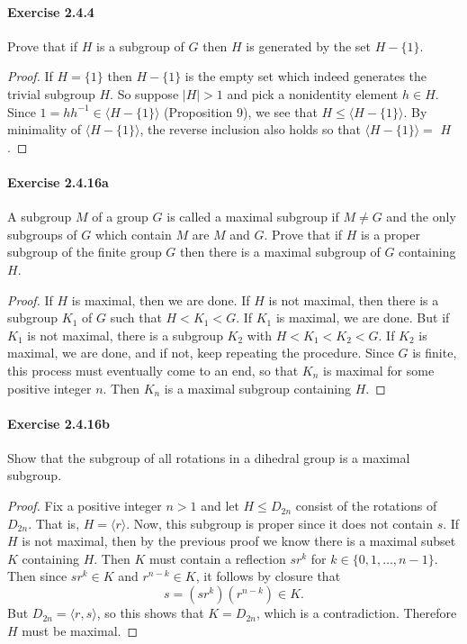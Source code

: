 \documentclass{article}
\theoremstyle{definition}
\begin{document}
\paragraph{Exercise 2.4.4} Prove that if $H$ is a subgroup of $G$ then $H$ is generated by the set $H-\{1\}$.
\begin{proof}
    If $H=\{1\}$ then $H-\{1\}$ is the empty set which indeed generates the trivial subgroup $H$. So suppose $|H|>1$ and pick a nonidentity element $h \in H$. Since $1=h h^{-1} \in\langle H-\{1\}\rangle$ (Proposition 9), we see that $H \leq\langle H-\{1\}\rangle$. By minimality of $\langle H-\{1\}\rangle$, the reverse inclusion also holds so that $\langle H-\{1\}\rangle=$ $H$.
\end{proof}



\paragraph{Exercise 2.4.16a} A subgroup $M$ of a group $G$ is called a maximal subgroup if $M \neq G$ and the only subgroups of $G$ which contain $M$ are $M$ and $G$. Prove that if $H$ is a proper subgroup of the finite group $G$ then there is a maximal subgroup of $G$ containing $H$.
\begin{proof}
If $H$ is maximal, then we are done. If $H$ is not maximal, then there is a subgroup $K_1$ of $G$ such that $H<K_1<G$. If $K_1$ is maximal, we are done. But if $K_1$ is not maximal, there is a subgroup $K_2$ with $H<K_1<K_2<G$. If $K_2$ is maximal, we are done, and if not, keep repeating the procedure. Since $G$ is finite, this process must eventually come to an end, so that $K_n$ is maximal for some positive integer $n$. Then $K_n$ is a maximal subgroup containing $H$.
\end{proof}



\paragraph{Exercise 2.4.16b} Show that the subgroup of all rotations in a dihedral group is a maximal subgroup.
\begin{proof}
    Fix a positive integer $n>1$ and let $H \leq D_{2 n}$ consist of the rotations of $D_{2 n}$. That is, $H=\langle r\rangle$. Now, this subgroup is proper since it does not contain $s$. If $H$ is not maximal, then by the previous proof we know there is a maximal subset $K$ containing $H$. Then $K$ must contain a reflection $s r^k$ for $k \in\{0,1, \ldots, n-1\}$. Then since $s r^k \in K$ and $r^{n-k} \in K$, it follows by closure that
$$
s=\left(s r^k\right)\left(r^{n-k}\right) \in K .
$$
But $D_{2 n}=\langle r, s\rangle$, so this shows that $K=D_{2 n}$, which is a contradiction. Therefore $H$ must be maximal.
\end{proof}
\end{document}
